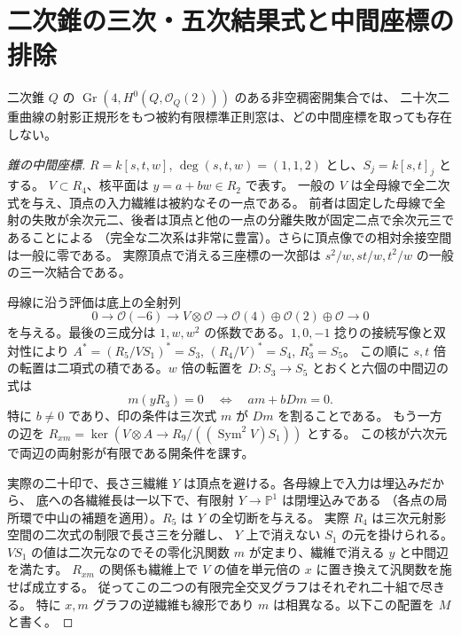 \section{二次錐の三次・五次結果式と中間座標の排除}
\label{sec:quadric-cone-middle}
\begin{theorem}\label{thm:general-quadric-cone-exclusion}
二次錐 $Q$ の $\operatorname{Gr}(4,H^0(Q,\mathcal O_Q(2)))$ のある非空稠密開集合では、
二十次二重曲線の射影正規形をもつ被約有限標準正則窓は、どの中間座標を取っても存在しない。
\end{theorem}
\begin{proof}[錐の中間座標]
$R=k[s,t,w]$, $\deg(s,t,w)=(1,1,2)$ とし、$S_j=k[s,t]_j$ とする。
$V\subset R_4$、核平面は $y=a+bw\in R_2$ で表す。
一般の $V$ は全母線で全二次式を与え、頂点の入力繊維は被約なその一点である。
前者は固定した母線で全射の失敗が余次元二、後者は頂点と他の一点の分離失敗が固定二点で余次元三であることによる
（完全な二次系は非常に豊富）。さらに頂点像での相対余接空間は一般に零である。
実際頂点で消える三座標の一次部は $s^2/w,st/w,t^2/w$ の一般の三一次結合である。

母線に沿う評価は底上の全射列
\[
 0\longrightarrow\mathcal O(-6)\longrightarrow V\otimes\mathcal O
 \longrightarrow\mathcal O(4)\oplus\mathcal O(2)\oplus\mathcal O\longrightarrow0
\]
を与える。最後の三成分は $1,w,w^2$ の係数である。$1,0,-1$ 捻りの接続写像と双対性により
$A^*=(R_5/VS_1)^*=S_3$, $(R_4/V)^*=S_4$, $R_3^*=S_5$。
この順に $s,t$ 倍の転置は二項式の積である。$w$ 倍の転置を $D:S_3\to S_5$ とおくと六個の中間辺の式は
\[
       m(yR_3)=0\quad\Longleftrightarrow\quad a m+b Dm=0 .
\]
特に $b\ne0$ であり、印の条件は三次式 $m$ が $Dm$ を割ることである。
もう一方の辺を
$R_{xm}=\ker(V\otimes A\to R_9/((\operatorname{Sym}^2V)S_1))$ とする。
この核が六次元で両辺の両射影が有限である開条件を課す。

実際の二十印で、長さ三繊維 $Y$ は頂点を避ける。各母線上で入力は埋込みだから、
底への各繊維長は一以下で、有限射 $Y\to\mathbb P^1$ は閉埋込みである
（各点の局所環で中山の補題を適用）。$R_5$ は $Y$ の全切断を与える。
実際 $R_4$ は三次元射影空間の二次式の制限で長さ三を分離し、
$Y$ 上で消えない $S_1$ の元を掛けられる。
$VS_1$ の値は二次元なのでその零化汎関数 $m$ が定まり、繊維で消える $y$ と中間辺を満たす。
$R_{xm}$ の関係も繊維上で $V$ の値を単元倍の $x$ に置き換えて汎関数を施せば成立する。
従ってこの二つの有限完全交叉グラフはそれぞれ二十組で尽きる。
特に $x,m$ グラフの逆繊維も線形であり $m$ は相異なる。以下この配置を $M$ と書く。
\end{proof}

